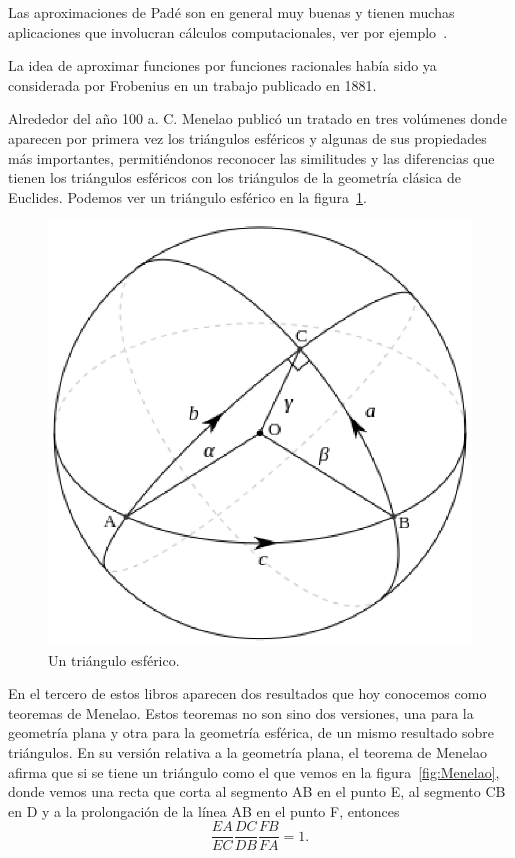Las aproximaciones de Padé son en general muy buenas y tienen muchas
aplicaciones que involucran cálculos computacionales, ver por
ejemplo~\cite{MR1383091}.  

La idea de aproximar funciones por funciones
racionales había sido ya considerada por Frobenius en un trabajo publicado en
1881.  

Alrededor del año 100 a. C. Menelao publicó un tratado en tres volúmenes donde
aparecen por primera vez los triángulos esféricos y algunas de sus propiedades
más importantes, permitiéndonos reconocer las similitudes y las diferencias que
tienen los triángulos esféricos con los triángulos de la geometría clásica de
Euclides.  Podemos ver un triángulo esférico en la figura~\ref{fig:esferico}.

\begin{figure}[h]
   \centering
   \includegraphics[scale=0.4]{images/esferico}
   \caption{Un triángulo esférico.}
   \label{fig:esferico}
\end{figure}

En el tercero de estos libros aparecen dos resultados que hoy conocemos como teoremas de
Menelao. Estos teoremas no son sino dos versiones, una para la geometría plana y otra para
la geometría esférica, de un mismo resultado sobre triángulos.  En su versión
relativa a la geometría plana, el teorema de Menelao afirma que si se tiene un
triángulo como el que vemos en la figura~\ref{fig:Menelao}, donde vemos una
recta que corta al segmento AB en el punto E, al segmento CB en D y a la
prolongación de la línea AB en el punto F, entonces 
\[
	\frac{EA}{EC}\frac{DC}{DB}\frac{FB}{FA}=1.
\]

